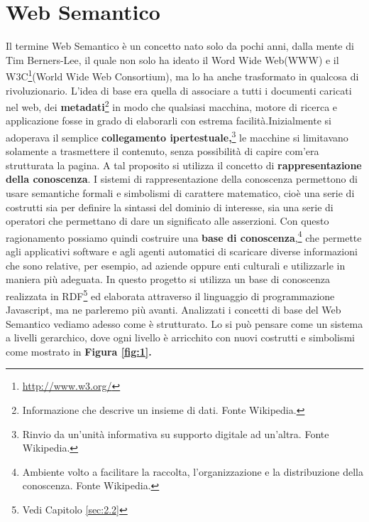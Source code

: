 \documentclass[a4paper,11pt]{article}
\begin{document}
\section{Web Semantico}
\label{sec:2}
Il termine Web Semantico\cite{BerHenLas2001, Lee1998, ShaNigBerHal2006} è un
concetto nato solo da pochi anni, dalla mente di Tim Berners-Lee, il quale non solo ha ideato il Word Wide Web(WWW) e il W3C\footnote{\url{http://www.w3.org/}}(World Wide Web Consortium), ma lo ha anche trasformato in qualcosa di rivoluzionario. L'idea di base era quella di associare a tutti i documenti caricati nel web, dei \textbf{metadati}\footnote{Informazione che descrive un insieme di dati. Fonte Wikipedia.} in modo che qualsiasi macchina, motore di ricerca e applicazione fosse in grado di elaborarli con estrema facilità.\newline Inizialmente si adoperava il semplice \textbf{collegamento ipertestuale,}\footnote{Rinvio da un'unità informativa su supporto digitale ad un'altra. Fonte Wikipedia.} le macchine si limitavano solamente a trasmettere il contenuto, senza possibilità di capire com'era strutturata la pagina.
A tal proposito si utilizza il concetto di \textbf{rappresentazione della conoscenza}.
I sistemi di rappresentazione della conoscenza permettono di usare semantiche formali e simbolismi di carattere matematico, cioè una serie di costrutti sia per definire la sintassi del dominio di interesse, sia una serie di operatori che permettano di dare un significato alle asserzioni.
Con questo ragionamento possiamo quindi costruire una \textbf{base di conoscenza},\footnote{Ambiente volto a facilitare la raccolta, l'organizzazione e la distribuzione della conoscenza. Fonte Wikipedia.} che permette agli applicativi software e agli agenti automatici di scaricare diverse informazioni che sono relative, per esempio, ad aziende oppure enti culturali e utilizzarle in maniera più adeguata. In questo progetto si utilizza un base di conoscenza realizzata in RDF\footnote{Vedi Capitolo \ref{sec:2.2}} ed elaborata attraverso il linguaggio di programmazione Javascript, ma ne parleremo più avanti.\newline
Analizzati i concetti di base del Web Semantico vediamo adesso come è strutturato. Lo si può pensare come un sistema a livelli gerarchico, dove ogni livello è arricchito con nuovi costrutti e simbolismi come mostrato in \textbf{Figura \ref{fig:1}.}
\end{document}
